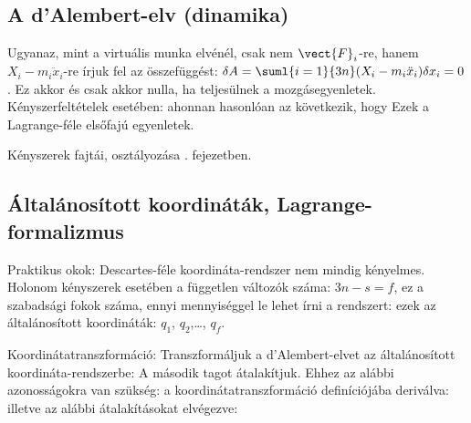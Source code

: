   \subsection{A d'Alembert-elv (dinamika)}\label{ss1:dalembert}
   
   Ugyanaz, mint a virtuális munka elvénél, csak nem $\vect{F}_i$-re, hanem $X_i-m_i\ddot{x}_i$-re írjuk fel az összefüggést: $\delta A = \suml{i=1}{3n}(X_i-m_i\ddot{x}_i)\delta x_i=0$.
   Ez akkor és csak akkor nulla, ha teljesülnek a mozgásegyenletek.
   Kényszerfeltételek esetében:
   ahonnan hasonlóan az következik, hogy 
   Ezek a Lagrange-féle elsőfajú egyenletek. 
   
   Kényszerek fajtái, osztályozása . fejezetben.

  \subsection{Általánosított koordináták, Lagrange-formalizmus}\label{ss1:lagrange2}
   
   Praktikus okok: Descartes-féle koordináta-rendszer nem mindig kényelmes.
   Holonom kényszerek esetében a független változók száma: $3n-s=f$, ez a szabadsági fokok száma, ennyi mennyiséggel le lehet írni a rendszert: ezek az általánosított koordináták: $q_1$, $q_2$,\dots, $q_f$. 
   
   Koordinátatranszformáció:
   Transzformáljuk a d'Alembert-elvet az általánosított koordináta-rendszerbe:
   A második tagot átalakítjuk.
   Ehhez az alábbi azonosságokra van szükség: a koordinátatranszformáció definíciójába deriválva:
   illetve az alábbi átalakításokat elvégezve:
   
